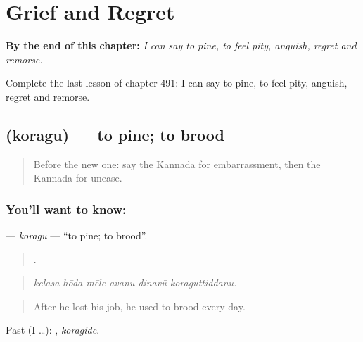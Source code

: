
\chapter{Grief and Regret}
\label{ch:ka-grief-and-regret}

\begin{chapteropening}
\textbf{By the end of this chapter:} \emph{I can say to pine, to feel pity, anguish, regret and remorse.}

Complete the last lesson of chapter 491: I can say to pine, to feel pity, anguish, regret and remorse.
\end{chapteropening}

\section[\texorpdfstring{\kn{ಕೊರಗು} (koragu)}{ಕೊರಗು (koragu)}]{ (koragu) — to pine; to brood}

\label{lesson:KA-C491-koragu}



\begin{quote}
Before the new one: say the Kannada for embarrassment, then the Kannada for unease.
\end{quote}

\subsection*{You'll want to know: }
\textbf{} — \emph{koragu} — \textquotedblleft{}to pine; to brood\textquotedblright{}.

\begin{quote}
     .
\end{quote}

\begin{quote}
\emph{kelasa hōda mēle avanu dinavū koraguttiddanu.}
\end{quote}

\begin{quote}
After he lost his job, he used to brood every day.
\end{quote}

Past (I …): , \emph{koragide}.

